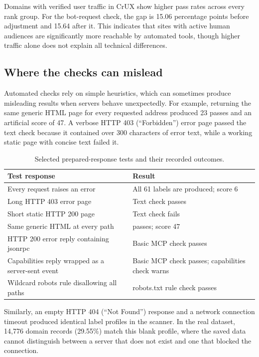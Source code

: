 \documentclass{article}
\begin{document}
Domains with verified user traffic in CrUX show higher pass rates across every rank group. For the bot-request check, the gap is 15.06 percentage points before adjustment and 15.64 after it. This indicates that sites with active human audiences are significantly more reachable by automated tools, though higher traffic alone does not explain all technical differences.

\subsection{Where the checks can mislead}

Automated checks rely on simple heuristics, which can sometimes produce misleading results when servers behave unexpectedly. For example, returning the same generic HTML page for every requested address produced 23 passes and an artificial score of 47. A verbose HTTP 403 (``Forbidden'') error page passed the text check because it contained over 300 characters of error text, while a working static page with concise text failed it.


\begin{table}[H]
\centering
\small
\setlength{\tabcolsep}{3pt}
\sloppy
\caption{Selected prepared-response tests and their recorded outcomes.}
\begin{tabularx}{\columnwidth}{>{\raggedright\arraybackslash}X>{\raggedright\arraybackslash}X}
\toprule
\textbf{Test response} & \textbf{Result} \\
\midrule
Every request raises an error & All 61 labels are produced; score 6 \\
Long HTTP 403 error page & Text check passes \\
Short static HTTP 200 page & Text check fails \\
Same generic HTML at every path & 23 passes; score 47 \\
HTTP 200 error reply containing jsonrpc & Basic MCP check passes \\
Capabilities reply wrapped as a server-sent event & Basic MCP check passes; capabilities check warns \\
Wildcard robots rule disallowing all paths & robots.txt rule check passes \\
\bottomrule
\end{tabularx}
\end{table}

Similarly, an empty HTTP 404 (``Not Found'') response and a network connection timeout produced identical label profiles in the scanner. In the real dataset, 14,776 domain records (29.55\%) match this blank profile, where the saved data cannot distinguish between a server that does not exist and one that blocked the connection.
\end{document}

